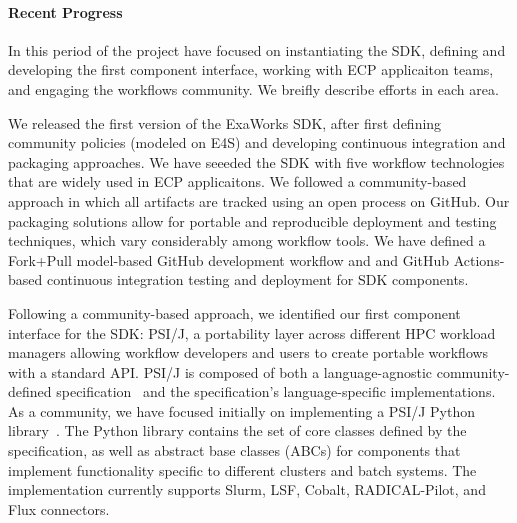 \paragraph{Recent Progress}



In this period of the project have focused on instantiating the SDK, defining and developing
the first component interface, working with ECP applicaiton teams, and engaging
the workflows community. We breifly describe efforts in each area. 

We released the first version of the ExaWorks SDK, after first defining
community policies (modeled on E4S) and developing continuous integration and packaging
approaches. We have seeeded the SDK with five workflow technologies 
that are widely used in ECP applicaitons. We followed a community-based
approach in which all artifacts are tracked using an open process on GitHub.
Our packaging solutions allow for portable and reproducible deployment and 
testing techniques, which vary considerably among workflow tools.  
We have defined a Fork+Pull model-based GitHub development workflow and and 
GitHub Actions-based continuous integration testing and deployment for SDK components.

Following a community-based approach, we identified our first component interface for
the SDK: PSI/J, a portability layer across different HPC workload managers 
allowing workflow developers and users to create portable workflows with a standard API. 
PSI/J is composed of both a language-agnostic community-defined specification~\cite{jpsi-spec} and the 
specification's language-specific implementations. 
As a community, we have focused initially on implementing a PSI/J Python 
library~\cite{jpsi-python}.   The Python library contains the set of
core classes defined by the specification, as well as abstract base classes (ABCs) for components 
that implement functionality specific to different clusters and batch systems.
The implementation currently supports Slurm, LSF, Cobalt, RADICAL-Pilot, and Flux connectors. 

